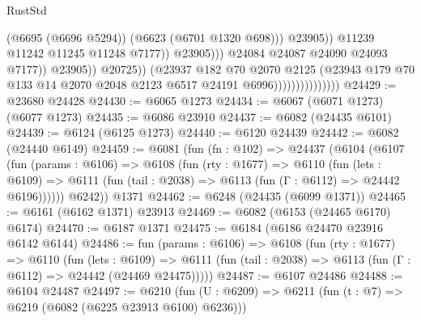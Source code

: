 \begin{lexlean}{RustStd}
\begin{coremodule}
                                                          (@6695 (@6696 @5294))
                                                          (@6623 (@6701 @1320 @698)))
                                                        @23905))
                                                    @11239
                                                    @11242
                                                    @11245
                                                    @11248
                                                    @7177))
                                                @23905)))
                                          @24084
                                          @24087
                                          @24090
                                          @24093
                                          @7177))
                                      @23905))
                                  @20725))
                              (@23937
                                @182
                                @70
                                @2070
                                @2125
                                (@23943
                                  @179
                                  @70
                                  @133
                                  @14
                                  @2070
                                  @2048
                                  @2123
                                  @6517
                                  @24191
                                  @6996)))))))))))))))
@24429 := @23680 @24428
@24430 := @6065 @1273
@24434 := @6067 (@6071 @1273) (@6077 @1273)
@24435 := @6086 @23910
@24437 := @6082 (@24435 @6101)
@24439 := @6124 (@6125 @1273)
@24440 := @6120 @24439
@24442 := @6082 (@24440 @6149)
@24459 := @6081
    (fun (fn : @102) =>
    @24437
      (@6104
        (@6107
          (fun (params : @6106) =>
          @6108
            (fun (rty : @1677) =>
            @6110
              (fun (lets : @6109) =>
              @6111 (fun (tail : @2038) => @6113 (fun (Γ : @6112) => @24442 @6196))))))
        @6242))
    @1371
@24462 := @6248 (@24435 (@6099 @1371))
@24465 := @6161 (@6162 @1371) @23913
@24469 := @6082 (@6153 (@24465 @6170) @6174)
@24470 := @6187 @1371
@24475 := @6184 (@6186 @24470 @23916 @6142 @6144)
@24486 := fun (params : @6106) =>
  @6108
    (fun (rty : @1677) =>
    @6110
      (fun (lets : @6109) =>
      @6111 (fun (tail : @2038) => @6113 (fun (Γ : @6112) => @24442 (@24469 @24475)))))
@24487 := @6107 @24486
@24488 := @6104 @24487
@24497 := @6210
    (fun (U : @6209) => @6211 (fun (t : @7) => @6219 (@6082 (@6225 @23913 @6100) @6236)))

\end{coremodule}
\end{lexlean}
